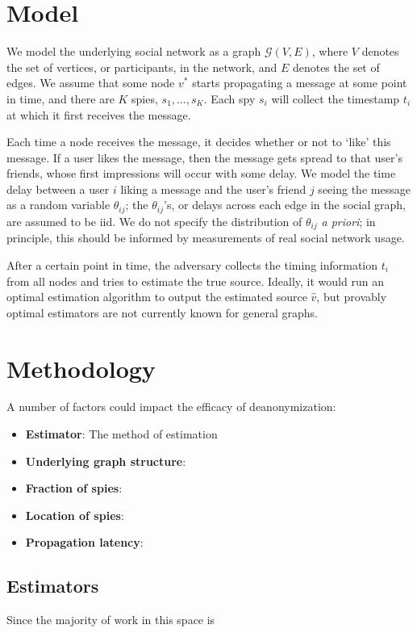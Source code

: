 \documentclass[10pt, twocolumn]{article}
\begin{document}
\section{Model}
We model the underlying social network as a graph $\mathcal G(V,E)$, where $V$ denotes the set of vertices, or participants, in the network, and $E$ denotes the set of edges. We assume that some node $v^*$ starts propagating a message at some point in time, and there are $K$ spies, $s_1,\ldots,s_K$. Each spy $s_i$ will collect the timestamp $t_i$ at which it first receives the message.

Each time a node receives the message, it decides whether or not to `like' this message. If a user likes the message, then the message gets spread to that user's friends, whose first impressions will occur with some delay. We model the time delay between a user $i$ liking a message and the user's friend $j$ seeing the message as a random variable $\theta_{ij}$; the $\theta_{ij}$'s, or delays across each edge in the social graph, are assumed to be iid. We do not specify the distribution of $\theta_{ij}$ \emph{a priori}; in principle, this should be informed by measurements of real social network usage.

After a certain point in time, the adversary collects the timing information $t_i$ from all nodes and tries to estimate the true source. Ideally, it would run an optimal estimation algorithm to output the estimated source $\hat v$, but provably optimal estimators are not currently known for general graphs.


\section{Methodology}
A number of factors could impact the efficacy of deanonymization:
\begin{itemize}
\item \textbf{Estimator}: The method of estimation 
\item \textbf{Underlying graph structure}:
\item \textbf{Fraction of spies}: 
\item \textbf{Location of spies}:
\item \textbf{Propagation latency}:
\end{itemize}

\subsection{Estimators}
Since the majority of work in this space is 
\end{document}
